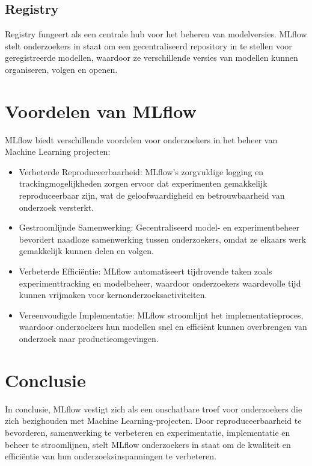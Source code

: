 \subsection{Registry}
Registry fungeert als een centrale hub voor het beheren van modelversies. MLflow stelt onderzoekers in staat om een gecentraliseerd repository in te stellen voor geregistreerde modellen, waardoor ze verschillende versies van modellen kunnen organiseren, volgen en openen.

\section{Voordelen van MLflow}

MLflow biedt verschillende voordelen voor onderzoekers in het beheer van Machine Learning projecten:

\begin{itemize}
    \item Verbeterde Reproduceerbaarheid: MLflow's zorgvuldige logging en trackingmogelijkheden zorgen ervoor dat experimenten gemakkelijk reproduceerbaar zijn, wat de geloofwaardigheid en betrouwbaarheid van onderzoek versterkt.
    \item Gestroomlijnde Samenwerking: Gecentraliseerd model- en experimentbeheer bevordert naadloze samenwerking tussen onderzoekers, omdat ze elkaars werk gemakkelijk kunnen delen en volgen.
    \item Verbeterde Efficiëntie: MLflow automatiseert tijdrovende taken zoals experimenttracking en modelbeheer, waardoor onderzoekers waardevolle tijd kunnen vrijmaken voor kernonderzoeksactiviteiten.
    \item Vereenvoudigde Implementatie: MLflow stroomlijnt het implementatieproces, waardoor onderzoekers hun modellen snel en efficiënt kunnen overbrengen van onderzoek naar productieomgevingen.
\end{itemize}

\section{Conclusie}

In conclusie, MLflow vestigt zich als een onschatbare troef voor onderzoekers die zich bezighouden met Machine Learning-projecten. Door reproduceerbaarheid te bevorderen, samenwerking te verbeteren en experimentatie, implementatie en beheer te stroomlijnen, stelt MLflow onderzoekers in staat om de kwaliteit en efficiëntie van hun onderzoeksinspanningen te verbeteren.

